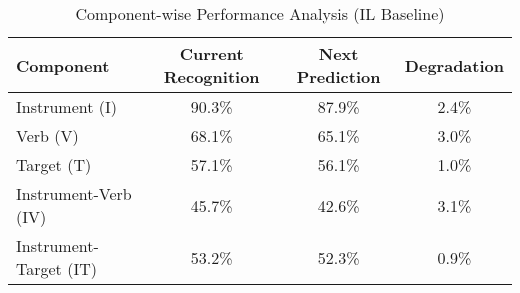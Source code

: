 
\begin{table}[h]
\centering
\caption{Component-wise Performance Analysis (IL Baseline)}
\label{tab:component_analysis}
\begin{tabular}{lccc}
\toprule
\textbf{Component} & \textbf{Current Recognition} & \textbf{Next Prediction} & \textbf{Degradation} \\
\midrule
Instrument (I) & 90.3\% & 87.9\% & 2.4\% \\
Verb (V) & 68.1\% & 65.1\% & 3.0\% \\
Target (T) & 57.1\% & 56.1\% & 1.0\% \\
Instrument-Verb (IV) & 45.7\% & 42.6\% & 3.1\% \\
Instrument-Target (IT) & 53.2\% & 52.3\% & 0.9\% \\
\bottomrule
\end{tabular}
\end{table}
